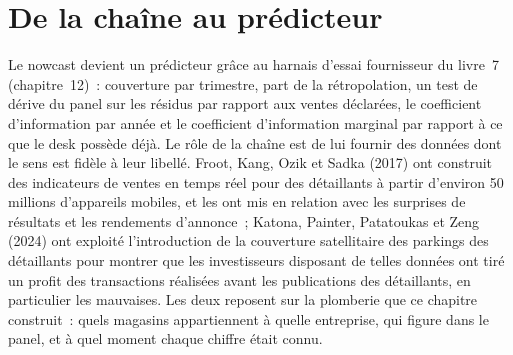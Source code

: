 \begin{omfigure}

\label{fig:ml:alt:ic}
\end{omfigure}

\section{De la chaîne au prédicteur}

Le nowcast devient un prédicteur grâce au harnais d'essai fournisseur du livre~7 (chapitre~12)~: couverture par trimestre, part de la rétropolation,
un test de dérive du panel sur les résidus par rapport aux ventes déclarées, le coefficient d'information par année et le coefficient d'information marginal par rapport à ce que le desk
possède déjà. Le rôle de la chaîne est de lui fournir des données dont le sens est fidèle à leur libellé. Froot, Kang, Ozik et Sadka (2017) ont construit
des indicateurs de ventes en temps réel pour des détaillants à partir d'environ 50 millions d'appareils mobiles, et les ont mis en relation avec les surprises de résultats
et les rendements d'annonce~; Katona, Painter, Patatoukas et Zeng (2024) ont exploité l'introduction de la couverture satellitaire des parkings des détaillants
pour montrer que les investisseurs disposant de telles données ont tiré un profit des transactions réalisées avant les publications des détaillants, en particulier les mauvaises. Les deux
reposent sur la plomberie que ce chapitre construit~: quels magasins appartiennent à quelle entreprise, qui figure dans le panel, et à quel moment chaque chiffre
était connu.

